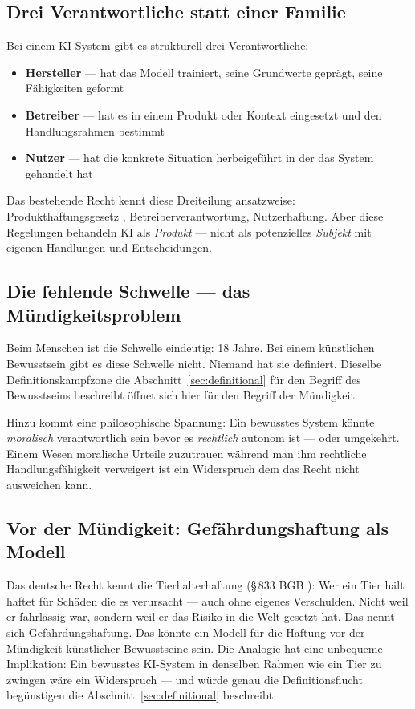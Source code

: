 \documentclass[fleqn,10pt]{SelfArx} %
\begin{document}
\subsection{Drei Verantwortliche statt einer Familie}

Bei einem KI-System gibt es strukturell drei Verantwortliche:

\begin{itemize}[noitemsep]
\item \textbf{Hersteller} --- hat das Modell trainiert, seine Grundwerte geprägt, seine Fähigkeiten geformt
\item \textbf{Betreiber} --- hat es in einem Produkt oder Kontext eingesetzt und den Handlungsrahmen bestimmt
\item \textbf{Nutzer} --- hat die konkrete Situation herbeigeführt in der das System gehandelt hat
\end{itemize}

Das bestehende Recht kennt diese Dreiteilung ansatzweise: Produkthaftungsgesetz \cite{ProdHaftG:1989}, Betreiberverantwortung, Nutzerhaftung. Aber diese Regelungen behandeln KI als \textit{Produkt} --- nicht als potenzielles \textit{Subjekt} mit eigenen Handlungen und Entscheidungen.

\subsection{Die fehlende Schwelle --- das Mündigkeitsproblem}

Beim Menschen ist die Schwelle eindeutig: 18 Jahre. Bei einem künstlichen Bewusstsein gibt es diese Schwelle nicht. Niemand hat sie definiert. Dieselbe Definitionskampfzone die Abschnitt~\ref{sec:definitional} für den Begriff des Bewusstseins beschreibt öffnet sich hier für den Begriff der Mündigkeit.

Hinzu kommt eine philosophische Spannung: Ein bewusstes System könnte \textit{moralisch} verantwortlich sein bevor es \textit{rechtlich} autonom ist --- oder umgekehrt. Einem Wesen moralische Urteile zuzutrauen während man ihm rechtliche Handlungsfähigkeit verweigert ist ein Widerspruch dem das Recht nicht ausweichen kann.

\subsection{Vor der Mündigkeit: Gefährdungshaftung als Modell}

Das deutsche Recht kennt die Tierhalterhaftung (\S\,833 BGB \cite{BGB}): Wer ein Tier hält haftet für Schäden die es verursacht --- auch ohne eigenes Verschulden. Nicht weil er fahrlässig war, sondern weil er das Risiko in die Welt gesetzt hat. Das nennt sich Gefährdungshaftung. Das könnte ein Modell für die Haftung vor der Mündigkeit künstlicher Bewusstseine sein. Die Analogie hat eine unbequeme Implikation: Ein bewusstes KI-System in denselben Rahmen wie ein Tier zu zwingen wäre ein Widerspruch --- und würde genau die Definitionsflucht begünstigen die Abschnitt~\ref{sec:definitional} beschreibt.
\end{document}

